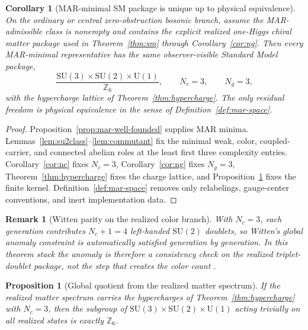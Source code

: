 \documentclass[11pt]{article}
\newtheorem{corollary}[theorem]{Corollary}
\newtheorem{proposition}[theorem]{Proposition}
\newtheorem{remark}[theorem]{Remark}
\newcommand{\SU}{\mathrm{SU}}
\newcommand{\U}{\mathrm{U}}
\begin{document}
\begin{corollary}[MAR-minimal SM package is unique up to physical equivalence]\label{cor:mar-sm-unique}
On the ordinary or central zero-obstruction bosonic branch, assume the MAR-admissible class is nonempty and contains the explicit realized one-Higgs chiral matter package used in Theorem~\ref{thm:sm} through Corollary~\ref{cor:ng}. Then every MAR-minimal representative has the same observer-visible Standard Model package,
\[
\frac{\SU(3)\times\SU(2)\times\U(1)}{\mathbb Z_6},
\qquad
N_c=3,\qquad
N_g=3,
\]
with the hypercharge lattice of Theorem~\ref{thm:hypercharge}. The only residual freedom is physical equivalence in the sense of Definition~\ref{def:mar-space}.
\end{corollary}

\begin{proof}
Proposition~\ref{prop:mar-well-founded} supplies MAR minima. Lemmas~\ref{lem:su2class}--\ref{lem:commutant} fix the minimal weak, color, coupled-carrier, and connected abelian roles at the least first three complexity entries. Corollary~\ref{cor:nc} fixes \(N_c=3\), Corollary~\ref{cor:ng} fixes \(N_g=3\), Theorem~\ref{thm:hypercharge} fixes the charge lattice, and Proposition~\ref{prop:z6} fixes the finite kernel. Definition~\ref{def:mar-space} removes only relabelings, gauge-center conventions, and inert implementation data.
\end{proof}

\begin{remark}[Witten parity on the realized color branch]\label{rem:witten-parity}
With \(N_c=3\), each generation contributes \(N_c+1=4\) left-handed \(\SU(2)\) doublets, so Witten's global anomaly constraint is automatically satisfied generation by generation. In this theorem stack the anomaly is therefore a consistency check on the realized triplet-doublet package, not the step that creates the color count \cite{witten82}.
\end{remark}

\begin{proposition}[Global quotient from the realized matter spectrum]\label{prop:z6}
If the realized matter spectrum carries the hypercharges of Theorem~\ref{thm:hypercharge} with $N_c=3$, then the subgroup of $\SU(3)\times\SU(2)\times\U(1)$ acting trivially on all realized states is exactly $\mathbb Z_6$.
\end{proposition}
\end{document}
